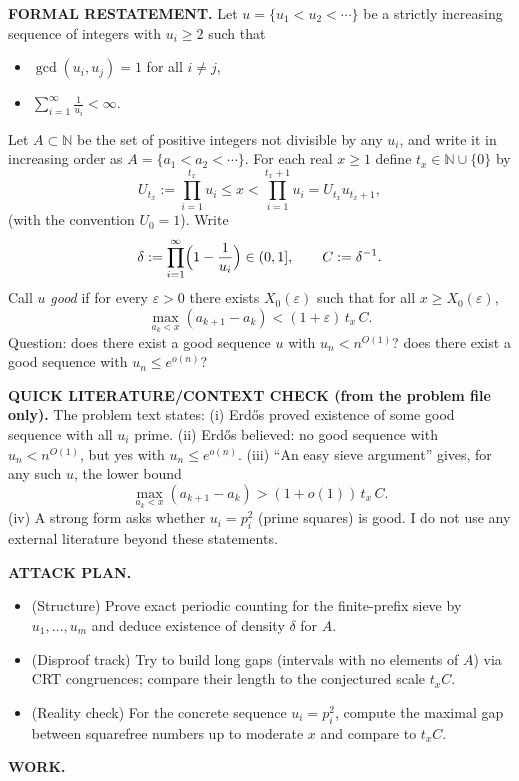 \noindent\textbf{FORMAL RESTATEMENT.}
Let $u=\{u_1<u_2<\cdots\}$ be a strictly increasing sequence of integers with $u_i\ge 2$ such that
\begin{itemize}
\item $\gcd(u_i,u_j)=1$ for all $i\ne j$,
\item $\sum_{i=1}^{\infty}\frac{1}{u_i}<\infty$.
\end{itemize}
Let $A\subset\mathbb N$ be the set of positive integers not divisible by any $u_i$, and write it in increasing order as
$A=\{a_1<a_2<\cdots\}$.
For each real $x\ge 1$ define $t_x\in\mathbb N\cup\{0\}$ by
\[
U_{t_x}:=\prod_{i=1}^{t_x}u_i\le x < \prod_{i=1}^{t_x+1}u_i=U_{t_x}u_{t_x+1},
\]
(with the convention $U_0=1$).
Write
\[\delta:=\prod_{i=1}^{\infty}\Bigl(1-\frac{1}{u_i}\Bigr)\in(0,1],\qquad C:=\delta^{-1}.
\]
Call $u$ \emph{good} if for every $\varepsilon>0$ there exists $X_0(\varepsilon)$ such that for all $x\ge X_0(\varepsilon)$,
\[
\max_{a_k<x}(a_{k+1}-a_k) < (1+\varepsilon)\,t_x\,C.
\]
Question: does there exist a good sequence $u$ with $u_n<n^{O(1)}$? does there exist a good sequence with $u_n\le e^{o(n)}$?

\medskip
\noindent\textbf{QUICK LITERATURE/CONTEXT CHECK (from the problem file only).}
The problem text states:
(i) Erd\H{o}s proved existence of some good sequence with all $u_i$ prime.
(ii) Erd\H{o}s believed: no good sequence with $u_n<n^{O(1)}$, but yes with $u_n\le e^{o(n)}$.
(iii) ``An easy sieve argument'' gives, for any such $u$, the lower bound
\[
\max_{a_k<x}(a_{k+1}-a_k)>(1+o(1))\,t_x\,C.
\]
(iv) A strong form asks whether $u_i=p_i^2$ (prime squares) is good.
I do not use any external literature beyond these statements.

\medskip
\noindent\textbf{ATTACK PLAN.}
\begin{itemize}
\item (Structure) Prove exact periodic counting for the finite-prefix sieve by $u_1,\dots,u_m$ and deduce existence of density $\delta$ for $A$.
\item (Disproof track) Try to build long gaps (intervals with no elements of $A$) via CRT congruences; compare their length to the conjectured scale $t_xC$.
\item (Reality check) For the concrete sequence $u_i=p_i^2$, compute the maximal gap between squarefree numbers up to moderate $x$ and compare to $t_xC$.
\end{itemize}

\medskip
\noindent\textbf{WORK.}

